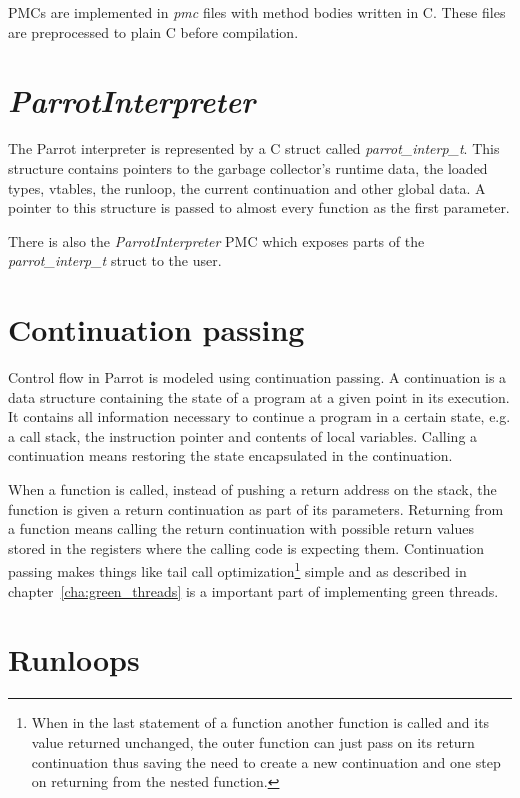 \documentclass[bachelor,english]{hgbthesis}
\begin{document}
PMCs are implemented in \textit{pmc} files with method bodies written in C. These files are preprocessed to plain C before compilation.

\section{\textit{ParrotInterpreter}}

The Parrot interpreter is represented by a C struct called \textit{parrot\_interp\_t}. This structure contains pointers to the garbage collector's runtime data, the loaded types, vtables, the runloop, the current continuation and other global data. A pointer to this structure is passed to almost every function as the first parameter.

There is also the \textit{ParrotInterpreter} PMC which exposes parts of the \textit{parrot\_interp\_t} struct to the user.

\section{Continuation passing}

Control flow in Parrot is modeled using continuation passing. A continuation is a data structure containing the state of a program at a given point in its execution. It contains all information necessary to continue a program in a certain state, e.g. a call stack, the instruction pointer and contents of local variables. Calling a continuation means restoring the state encapsulated in the continuation.

When a function is called, instead of pushing a return address on the stack, the function is given a return continuation as part of its parameters. Returning from a function means calling the return continuation with possible return values stored in the registers where the calling code is expecting them. Continuation passing makes things like tail call optimization\footnote{When in the last statement of a function another function is called and its value returned unchanged, the outer function can just pass on its return continuation thus saving the need to create a new continuation and one step on returning from the nested function.} simple and as described in chapter~\ref{cha:green_threads} is a important part of implementing green threads.

\section{Runloops}
\label{sec:Runloops}
\end{document}
